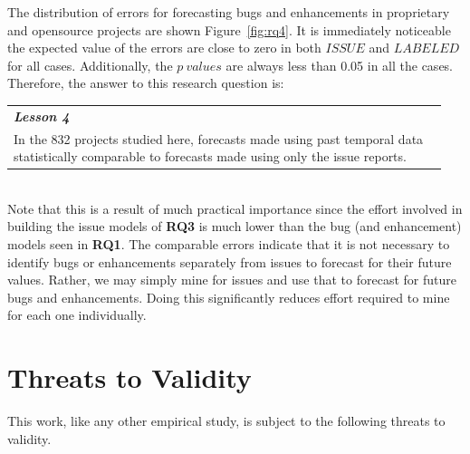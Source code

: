 \documentclass[sigconf, preprint]{acmart}
\newcommand{\fig}[1]{Figure~\ref{fig:#1}}
\begin{document}
The distribution of errors for forecasting bugs and enhancements in proprietary 
and opensource projects are shown \fig{rq4}. It is immediately noticeable the 
expected value of the errors are close to zero in both $\mathit{ISSUE}$ and 
$\mathit{LABELED}$ for all cases. Additionally, the $p~values$ are always less 
than 0.05 in all the cases. Therefore, the answer to this research question 
is:\\[0.1cm]
\noindent\begin{minipage}{\linewidth}
	\begin{center}
		\begin{tabular}{p{0.95\linewidth}}
			\arrayrulecolor{Gray}
			\hline
			\rowcolor{Gray}
			\textbf{\textit{Lesson 4}}\bigstrut\\
			\rowcolor{Gray} In the 832 projects studied here, forecasts made using past 
			temporal data 
		statistically comparable to	forecasts made using only the issue reports.\\\hline
		\end{tabular}
	\end{center}
\end{minipage}\bigstrut[t]\\

Note that this is a result of much practical
importance since the effort involved in building the issue models of {\bf RQ3} is much lower than the bug (and enhancement) models seen in {\bf RQ1}.  The comparable errors indicate that it is not necessary to identify bugs or enhancements separately from issues to forecast for their future values. Rather, we may simply mine for issues and use that to forecast for future bugs and enhancements. Doing this significantly reduces effort required to mine for each one individually. 




\section{Threats to Validity}
\label{sect:threats}
This work, like any other empirical study, is subject to the following threats 
to validity.
    
\end{document}
